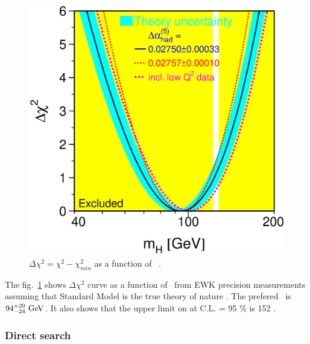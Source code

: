 \begin{figure}[t]
\centering
\includegraphics[height=0.5\textheight]{figures/w12_blueband.eps} %
\caption{$\Delta \chi^2 = \chi^2 - \chi^2_{min}$ as a function of \mHi~\cite{LEP-2}.}
\label{fig:EWKprecision}
\end{figure}
The fig.~\ref{fig:EWKprecision} 
shows $\Delta \chi^2$ curve as a function of \mHi\ from EWK precision measurements
assuming that Standard Model is the true theory of nature \cite{LEP-2}. 
The prefered \mHi\ is $94_{-24}^{+29}~\mathrm{Ge\kern -0.1em V}$. It also shows that 
the upper limit on \mHi at C.L. = 95 \% is 152 \GeV. 

%
\subsubsection{Direct search}  

